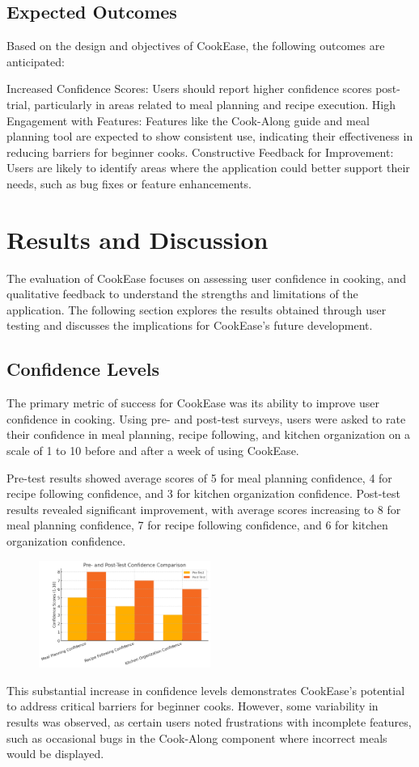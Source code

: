 \documentclass[10pt,twocolumn]{article}
\begin{document}
\subsection{Expected Outcomes}
Based on the design and objectives of CookEase, the following outcomes are anticipated:

Increased Confidence Scores: Users should report higher confidence scores post-trial, particularly in areas related to meal planning and recipe execution.
High Engagement with Features: Features like the Cook-Along guide and meal planning tool are expected to show consistent use, indicating their effectiveness in reducing barriers for beginner cooks.
Constructive Feedback for Improvement: Users are likely to identify areas where the application could better support their needs, such as bug fixes or feature enhancements.

\section{Results and Discussion}
The evaluation of CookEase focuses on assessing user confidence in cooking, and qualitative feedback to understand the strengths and limitations of the application. The following section explores the results obtained through user testing and discusses the implications for CookEase's future development.

\subsection{Confidence Levels}
The primary metric of success for CookEase was its ability to improve user confidence in cooking. Using pre- and post-test surveys, users were asked to rate their confidence in meal planning, recipe following, and kitchen organization on a scale of 1 to 10 before and after a week of using CookEase.

Pre-test results showed average scores of 5 for meal planning confidence, 4 for recipe following confidence, and 3 for kitchen organization confidence.
Post-test results revealed significant improvement, with average scores increasing to 8 for meal planning confidence, 7 for recipe following confidence, and 6 for kitchen organization confidence.
\begin{figure}[h!]
\includegraphics[width=0.5\textwidth]{images/pre-postconfidence.png}
\centering
\end{figure} 
This substantial increase in confidence levels demonstrates CookEase's potential to address critical barriers for beginner cooks. However, some variability in results was observed, as certain users noted frustrations with incomplete features, such as occasional bugs in the Cook-Along component where incorrect meals would be displayed.
\end{document}
